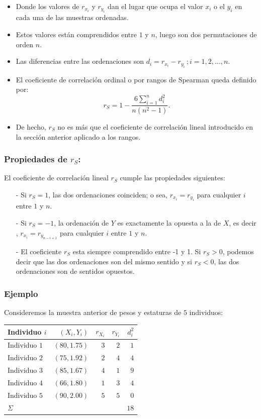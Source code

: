 \begin{frame}
\begin{itemize}
\item Donde los valores de $r_{x_i}$ y $r_{y_i}$ dan el lugar que ocupa el valor $x_i$ o el
$y_i$ en cada una de las muestras ordenadas.
\item  Estos valores están comprendidos entre $1$ y $n$, luego
son dos permutaciones de orden $n$.
\item Las diferencias entre las ordenaciones son $d_i=r_{x_i}-r_{y_i}\, ; i=1,2,\ldots,n$.
\item El coeficiente de correlación ordinal o por rangos de Spearman queda definido por:
$$
r_S= 1-\frac{6\sum\limits_{i=1}^n d^2_i}{n \left(n^2-1\right)}.
$$
\item 
De hecho, $r_S$ no es más que el coeficiente de correlación lineal introducido en la
sección anterior aplicado a los rangos.
\end{itemize}
\end{frame}

\begin{frame}
\frametitle{Propiedades de $r_S$:}
El coeficiente de correlación lineal  $r_S$ cumple las propiedades siguientes:

\begin{itemize}
\item[-] Si $r_S  = 1$, las dos ordenaciones coinciden; o sea,
$r_{x_i}=r_{y_i}$ para cualquier $i$ entre $1$ y $n$.

\item[-] Si $r_S  = -1$, la ordenación de  $Y$ es exactamente la opuesta a la de $X$, es decir
,  $r_{x_i}=r_{y_{n-i+1}}$  para cualquier $i$ entre $1$ y $n$.

\item[-]  El coeficiente $r_S$ esta siempre comprendido  entre -1
y 1. Si $r_S  >0$, podemos decir   que las dos ordenaciones son del mismo sentido
 y si $r_S <0$, las dos ordenaciones son de sentidos opuestos.
\end{itemize}
\end{frame}

\begin{frame}
\frametitle{Ejemplo}

Consideremos la muestra anterior de pesos y estaturas de $5$ individuos:

\begin{center}
\begin{tabular}{l|r|r|r|r|}
 Individuo $i$ & $(X_i,Y_i)$ &  $r_{X_i}$ &$r_{Y_i}$ & $d^2_i$ \\\hline
 Individuo $1$ & $(80,1.75)$ & $3$ & $2$ & $1$\\
 Individuo $2$ & $(75,1.92)$ & $2$ & $4$ & $4$\\
 Individuo $3$ & $(85,1.67)$ & $4$ & $1$ & $9$\\
 Individuo $4$ & $(66,1.80)$ & $1$ & $3$ & $4$\\
 Individuo $5$ & $(90,2.00)$ & $5$ & $5$ & $0$\\\hline
 $\Sigma$ & & & & $18$
\end{tabular}
\end{center}
\end{frame}

